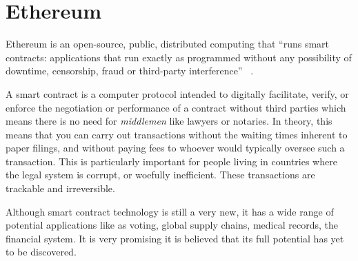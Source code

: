\section{Ethereum}

Ethereum is an open-source, public, distributed computing that ``runs
smart contracts: applications that run exactly as programmed without
any possibility of downtime, censorship, fraud or third-party
interference'' ~\cite{hid-sp18-506-EthereumOrg}.

A smart contract is a computer protocol intended to digitally
facilitate, verify, or enforce the negotiation or performance of a
contract without third parties which means there is no need for
\emph{middlemen} like lawyers or notaries. In theory, this means that
you can carry out transactions without the waiting times inherent to
paper filings, and without paying fees to whoever would typically
oversee such a transaction. This is particularly important for people
living in countries where the legal system is corrupt, or woefully
inefficient. These transactions are trackable and irreversible.

Although smart contract technology is still a very new, it has a wide
range of potential applications like as voting, global supply chains,
medical records, the financial system. It is very promising it is
believed that its full potential has yet to be discovered.
